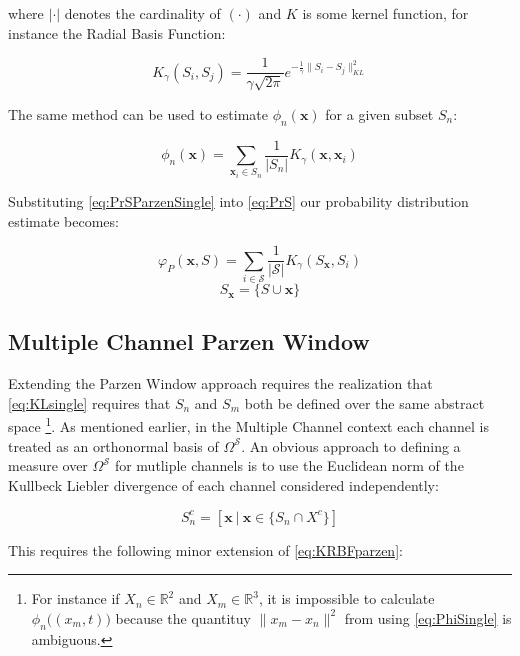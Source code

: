 \documentclass[10pt]{article}
\begin{document}
where \( | \cdot | \) denotes the cardinality of \( ( \cdot ) \) and \( K \) is some kernel function, for instance the Radial Basis Function:

\begin{equation} \label{eq:KRBFparzen}
K_\gamma( S_i, S_j ) =  \frac{1}{\gamma \sqrt{2\pi} } e^{-\frac{1}{\gamma} \|S_i - S_j \|_{KL}^2}
\end{equation}

The same method can be used to estimate \( \phi_n(\mathbf{x}) \) for a given subset \( S_n \):

\begin{equation} \label{eq:PhiSingle}
\phi_n( \mathbf{x} ) = \sum_{\mathbf{x}_i \in S_n} \frac{1}{|S_n|}  K_\gamma (\mathbf{x}, \mathbf{x}_i ) 
\end{equation}

Substituting \ref{eq:PrSParzenSingle} into \ref{eq:PrS} our probability distribution estimate becomes:

\begin{equation} \label{eq:VarphiParzenSingle}
\varphi_P(\mathbf{x}, S) = \sum_{i \in \mathcal{S}} \frac{1}{|\mathcal{S}|} K_\gamma ( S_{\mathbf{x}}, S_i )
\end{equation}
\[ S_{\mathbf{x}} = \{ S \cup \mathbf{x} \}\]


\subsection{ Multiple Channel Parzen Window}

Extending the Parzen Window approach requires the realization that \ref{eq:KLsingle} requires that \( S_n \) and \( S_m \) both be defined over the same abstract space \footnote{ For instance if \( X_n \in \mathbb{R}^2 \) and \( X_m \in \mathbb{R}^3 \), it is impossible to calculate \( \phi_n\big( (x_m,t) \big) \) because the quantituy \( \| x_m - x_n \|^2 \) from using \ref{eq:PhiSingle} is ambiguous.}.  As mentioned earlier, in the Multiple Channel context each channel is treated as an orthonormal basis of \( \Omega^\mathcal{S} \).  An obvious approach to defining a measure over \( \Omega^\mathcal{S} \) for mutliple channels is to use the Euclidean norm of the Kullbeck Liebler divergence of each channel considered independently:

\[ S_n^c = [ \mathbf{x} \ | \ \mathbf{x} \in \{ S_n \cap X^c \} ] \]

This requires the following minor extension of \ref{eq:KRBFparzen}:
\end{document}
